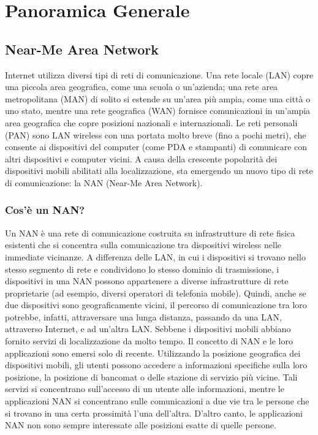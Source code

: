 \chapter{Panoramica Generale}


\section{Near-Me Area Network}
Internet utilizza diversi tipi di reti di comunicazione. Una rete
locale (LAN) copre una piccola area geografica, come una scuola o
un'azienda; una rete area metropolitana (MAN) di solito si estende su
un'area più ampia, come una città o uno stato, mentre una rete geografica
(WAN) fornisce comunicazioni in un'ampia area geografica che copre posizioni
nazionali e internazionali. Le reti personali (PAN) sono LAN wireless con una
portata molto breve (fino a pochi metri), che consente ai dispositivi del
computer (come PDA e stampanti) di comunicare con altri dispositivi e computer
vicini. A causa della crescente popolarità dei dispositivi mobili abilitati
alla localizzazione, sta emergendo un nuovo tipo di rete di comunicazione: la
NAN (Near-Me Area Network).
\subsection{Cos'è un NAN?}
Un NAN è una rete di comunicazione costruita su infrastrutture di rete
fisica esistenti che si concentra sulla comunicazione tra dispositivi wireless
nelle immediate vicinanze. A differenza delle LAN, in cui i dispositivi si
trovano nello stesso segmento di rete e condividono lo stesso dominio di
trasmissione, i dispositivi in ​​una NAN possono appartenere a diverse
infrastrutture di rete proprietarie (ad esempio, diversi operatori di telefonia
mobile). Quindi, anche se due dispositivi sono geograficamente vicini, il
percorso di comunicazione tra loro potrebbe, infatti, attraversare una lunga
distanza, passando da una LAN, attraverso Internet, e ad un'altra LAN.
Sebbene i dispositivi mobili abbiano fornito servizi di localizzazione da
molto tempo. Il concetto di NAN e le loro applicazioni sono emersi solo di
recente. Utilizzando la
posizione geografica dei dispositivi mobili, gli utenti possono accedere a
informazioni specifiche sulla loro posizione, la posizione di bancomat o delle
stazione di
servizio più vicine. Tali servizi si concentrano sull'accesso di un utente alle
informazioni, mentre le applicazioni NAN si concentrano sulle comunicazioni a
due vie tra le persone che si trovano in una certa prossimità l'una dell'altra.
D'altro canto, le applicazioni NAN non sono sempre interessate alle posizioni
esatte di quelle persone.



